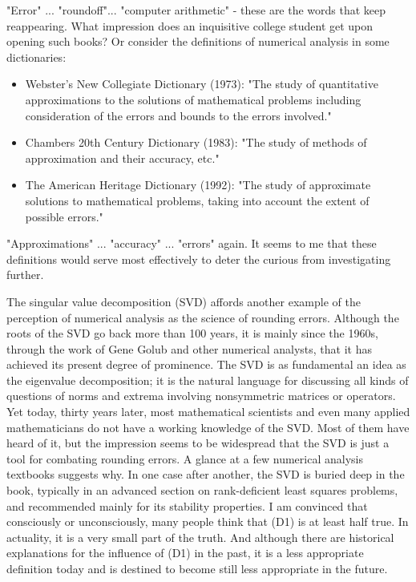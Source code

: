 "Error" ... "roundoff"... "computer arithmetic" - these are the words that keep reappearing. What impression does an inquisitive college student get upon opening such books? Or consider the definitions of numerical analysis in some dictionaries:
\begin{itemize}
    \item Webster's New Collegiate Dictionary (1973): "The study of quantitative approximations to the solutions of mathematical problems including consideration of the errors and bounds to the errors involved."
    \item Chambers 20th Century Dictionary (1983): "The study of methods of approximation and their accuracy, etc."
    \item The American Heritage Dictionary (1992): "The study of approximate solutions to mathematical problems, taking into account the extent of possible errors."
\end{itemize}

"Approximations" ... "accuracy" ... "errors" again. It seems to me that these definitions would serve most effectively to deter the curious from investigating further.

The singular value decomposition (SVD) affords another example of the perception of numerical analysis as the science of rounding errors. Although the roots of the SVD go back more than 100 years, it is mainly since the 1960s, through the work of Gene Golub and other numerical analysts, that it has achieved its present degree of prominence. The SVD is as fundamental an idea as the eigenvalue decomposition; it is the natural language for discussing all kinds of questions of norms and extrema involving nonsymmetric matrices or operators. Yet today, thirty years later, most mathematical scientists and even many applied mathematicians do not have a working knowledge of the SVD. Most of them have heard of it, but the impression seems to be widespread that the SVD is just a tool for combating rounding errors. A glance at a few numerical analysis textbooks suggests why. In one case after another, the SVD is buried deep in the book, typically in an advanced section on rank-deficient least squares problems, and recommended mainly for its stability properties.
I am convinced that consciously or unconsciously, many people think that (D1) is at least half true. In actuality, it is a very small part of the truth. And although there are historical explanations for the influence of (D1) in the past, it is a less appropriate definition today and is destined to become still less appropriate in the future.

